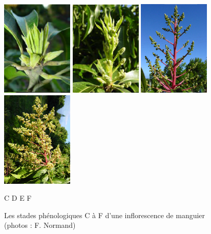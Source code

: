 \documentclass[xcolor={dvipsnames}]{beamer}
\begin{document}
\begin{frame}
\begin{figure}[ht]
 \label{fig:inflo}
\end{figure}
\begin{figure}[ht]
 \centering
 \includegraphics[scale = 0.5]{../photos/infloC.png}
 \includegraphics[scale = 0.5]{../photos/infloD.png}
 \includegraphics[scale = 0.5]{../photos/infloE.png}
 \includegraphics[scale = 0.5]{../photos/infloF.png}
 
 C \hspace{1.4cm} D \hspace{1.4cm} E \hspace{1.4cm} F
 \caption{Les stades phénologiques C à F d'une inflorescence de manguier (photos : F. Normand)}
 \label{fig:stades_inflo}
\end{figure}

\end{frame}
\end{document}
